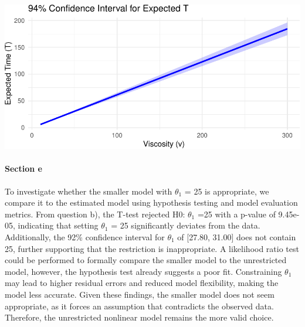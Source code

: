 \documentclass[
  11pt,
]{article}
\begin{document}
\includegraphics{ReportAssignment2_files/figure-latex/unnamed-chunk-29-1.pdf}

\paragraph{Section e}\label{section-e-1}

To investigate whether the smaller model with \(\theta_1\) = 25 is
appropriate, we compare it to the estimated model using hypothesis
testing and model evaluation metrics. From question b), the T-test
rejected H0: \(\theta_1\) =25 with a p-value of 9.45e-05, indicating
that setting \(\theta_1\) = 25 significantly deviates from the data.
Additionally, the 92\% confidence interval for \(\theta_1\) of {[}27.80,
31.00{]} does not contain 25, further supporting that the restriction is
inappropriate. A likelihood ratio test could be performed to formally
compare the smaller model to the unrestricted model, however, the
hypothesis test already suggests a poor fit. Constraining \(\theta_1\)
may lead to higher residual errors and reduced model flexibility, making
the model less accurate. Given these findings, the smaller model does
not seem appropriate, as it forces an assumption that contradicts the
observed data. Therefore, the unrestricted nonlinear model remains the
more valid choice.
\end{document}
